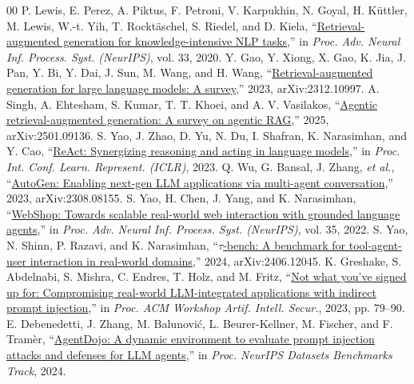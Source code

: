 \documentclass{IEEEtran}
\begin{document}
\begin{thebibliography}{00}
 P. Lewis, E. Perez, A. Piktus, F. Petroni, V. Karpukhin, N. Goyal, H. K\"{u}ttler, M. Lewis, W.-t. Yih, T. Rockt\"{a}schel, S. Riedel, and D. Kiela, ``\href{https://arxiv.org/abs/2005.11401}{Retrieval-augmented generation for knowledge-intensive NLP tasks},'' in \textit{Proc. Adv. Neural Inf. Process. Syst. (NeurIPS)}, vol. 33, 2020.
 Y. Gao, Y. Xiong, X. Gao, K. Jia, J. Pan, Y. Bi, Y. Dai, J. Sun, M. Wang, and H. Wang, ``\href{https://arxiv.org/abs/2312.10997}{Retrieval-augmented generation for large language models: A survey},'' 2023, arXiv:2312.10997.
 A. Singh, A. Ehtesham, S. Kumar, T. T. Khoei, and A. V. Vasilakos, ``\href{https://arxiv.org/abs/2501.09136}{Agentic retrieval-augmented generation: A survey on agentic RAG},'' 2025, arXiv:2501.09136.
 S. Yao, J. Zhao, D. Yu, N. Du, I. Shafran, K. Narasimhan, and Y. Cao, ``\href{https://arxiv.org/abs/2210.03629}{ReAct: Synergizing reasoning and acting in language models},'' in \textit{Proc. Int. Conf. Learn. Represent. (ICLR)}, 2023.
 Q. Wu, G. Bansal, J. Zhang, \textit{et al.}, ``\href{https://arxiv.org/abs/2308.08155}{AutoGen: Enabling next-gen LLM applications via multi-agent conversation},'' 2023, arXiv:2308.08155.
 S. Yao, H. Chen, J. Yang, and K. Narasimhan, ``\href{https://arxiv.org/abs/2207.01206}{WebShop: Towards scalable real-world web interaction with grounded language agents},'' in \textit{Proc. Adv. Neural Inf. Process. Syst. (NeurIPS)}, vol. 35, 2022.
 S. Yao, N. Shinn, P. Razavi, and K. Narasimhan, ``\href{https://arxiv.org/abs/2406.12045}{$\tau$-bench: A benchmark for tool-agent-user interaction in real-world domains},'' 2024, arXiv:2406.12045.
 K. Greshake, S. Abdelnabi, S. Mishra, C. Endres, T. Holz, and M. Fritz, ``\href{https://arxiv.org/abs/2302.12173}{Not what you've signed up for: Compromising real-world LLM-integrated applications with indirect prompt injection},'' in \textit{Proc. ACM Workshop Artif. Intell. Secur.}, 2023, pp. 79--90.
 E. Debenedetti, J. Zhang, M. Balunovi\'{c}, L. Beurer-Kellner, M. Fischer, and F. Tram\`{e}r, ``\href{https://arxiv.org/abs/2406.13352}{AgentDojo: A dynamic environment to evaluate prompt injection attacks and defenses for LLM agents},'' in \textit{Proc. NeurIPS Datasets Benchmarks Track}, 2024.

\end{thebibliography}
\end{document}
